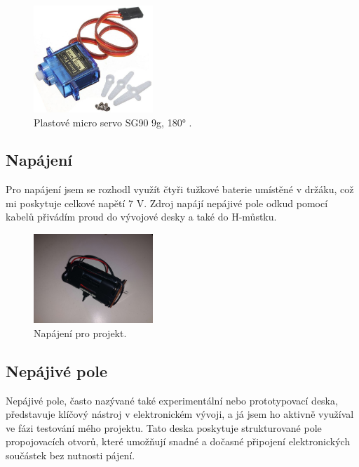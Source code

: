 \documentclass[12pt, a4paper,
oneside
openany
]{report}
\begin{document}
	\begin{figure}[ht]
		\centering 
		\includegraphics[width=0.4\textwidth]{image/servo.jpg} %
		\caption{Plastové micro servo SG90 9g, 180° \cite{servo}.} 
	\end{figure}

\subsection{Napájení}
\noindent Pro napájení jsem se rozhodl využít čtyři tužkové baterie umístěné v držáku, což mi poskytuje celkové napětí 7 V. Zdroj napájí nepájivé pole odkud pomocí kabelů přivádím proud do vývojové desky a také do H-můstku.

	\vspace*{0.01\textheight}

	\begin{figure}[ht]
		\centering 
		\includegraphics[width=0.4\textwidth]{image/zdroj.jpg} %
		\caption{Napájení pro projekt.} 
	\end{figure}

\newpage
\subsection{Nepájivé pole}
\noindent Nepájivé pole, často nazývané také experimentální nebo prototypovací deska, představuje klíčový nástroj v elektronickém vývoji, a já jsem ho aktivně využíval ve fázi testování mého projektu. Tato deska poskytuje strukturované pole propojovacích otvorů, které umožňují snadné a dočasné připojení elektronických součástek bez nutnosti pájení. 
\end{document}
